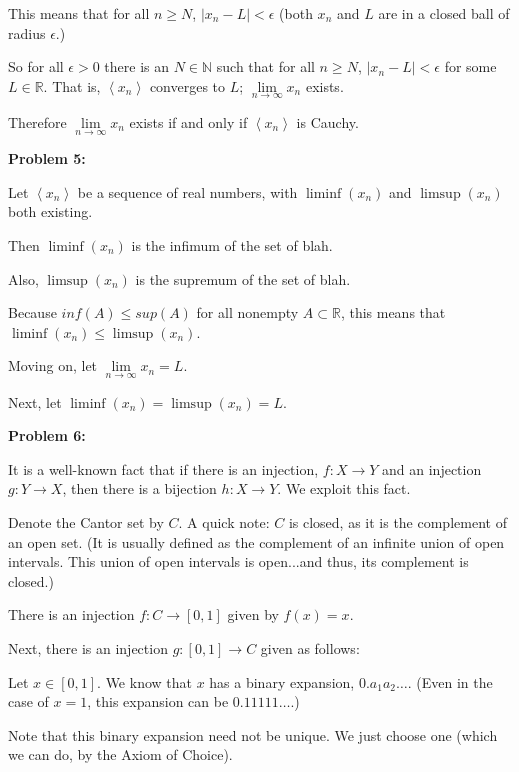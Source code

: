 \documentclass[a4paper,12pt]{article}
\newcommand{\tab}{\hspace{4mm}} %
\newcommand{\shunt}{\vspace{20mm}}
\newcommand{\absval}[1]{\lvert #1 \rvert}
\newcommand{\anbrack}[1]{\left\langle #1 \right\rangle}
\newcommand{\ep}{\epsilon}
\newcommand{\N}{\mathbb{N}}
\newcommand{\R}{\mathbb{R}}
\begin{document}
\tab This means that for all $n \geq N$, $\absval{x_n - L} < \ep$ (both $x_n$ and $L$ are in a closed ball of radius $\ep$.)

\tab So for all $\ep >0$ there is an $N \in \N$ such that for all $n \geq N$, $\absval{x_n - L} < \ep$ for some $L \in \R$. That is, $\anbrack{x_n}$ converges to $L$; $\lim\limits_{n \to \infty} x_n$ exists.

Therefore $\lim\limits_{n \to \infty} x_n$ exists if and only if $\anbrack{x_n}$ is Cauchy.

\shunt

{\bf Problem 5:}

Let $\anbrack{x_n}$ be a sequence of real numbers, with $\liminf(x_n)$ and $\limsup(x_n)$ both existing.

Then $\liminf(x_n)$ is the infimum of the set of blah.

Also, $\limsup(x_n)$ is the supremum of the set of blah.

Because $inf(A) \leq sup(A)$ for all nonempty $A \subset \R$, this means that $\liminf(x_n) \leq \limsup(x_n)$.

Moving on, let $\lim\limits_{n \to \infty} x_n = L$.

\tab %

Next, let $\liminf(x_n) = \limsup(x_n) = L$.

\tab %

\shunt

{\bf Problem 6:}

It is a well-known fact that if there is an injection, $f: X \to Y$ and an injection $g: Y \to X$, then there is a bijection $h: X \to Y$. We exploit this fact.

Denote the Cantor set by $C$. A quick note: $C$ is closed, as it is the complement of an open set. (It is usually defined as the complement of an infinite union of open intervals. This union of open intervals is open...and thus, its complement is closed.)

There is an injection $f: C \to [0,1]$ given by $f(x) = x$.

Next, there is an injection $g: [0,1] \to C$ given as follows:

\tab Let $x \in [0,1]$. We know that $x$ has a binary expansion, $0.a_1a_2 \ldots$. (Even in the case of $x=1$, this expansion can be $0.11111\ldots$.)

\tab Note that this binary expansion need not be unique. We just choose one (which we can do, by the Axiom of Choice).
\end{document}
